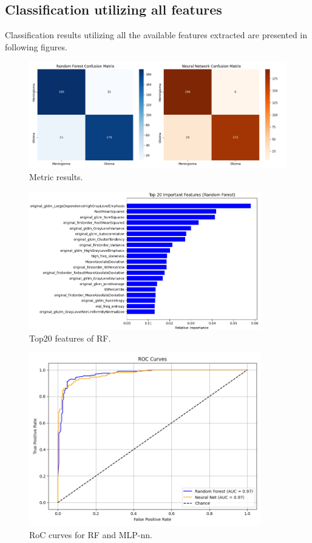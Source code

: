 \documentclass[11pt,a4paper]{article}
\begin{document}
	\subsection{Classification utilizing all features}

		Classification results utilizing all the available features extracted are presented in following figures.
		\begin{figure}[H]
			\centering
			\includegraphics[width=1.1\textwidth]{images/Metrics_all_features.png}
			\caption{Metric results.}
			\label{fig1:}
		\end{figure}		

		\begin{figure}[H]
			\centering
			\includegraphics[width=0.9\textwidth]{images/top20features_all_features_rf.png}
			\caption{Top20 features of RF.}
			\label{fig1:}
		\end{figure}		

		\begin{figure}[H]
			\centering
			\includegraphics[width=0.9\textwidth]{images/roc_curves_all_features.png}
			\caption{RoC curves for RF and MLP-nn.}
			\label{fig1:}
		\end{figure}		
\end{document}
